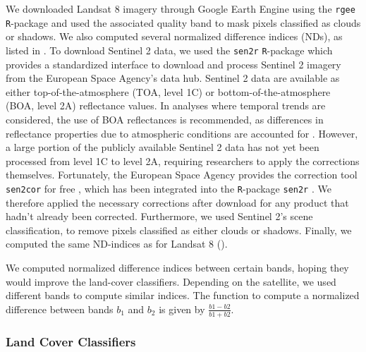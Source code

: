 \documentclass[../FinalThesis.tex]{subfiles}
\begin{document}
We downloaded Landsat 8 imagery through Google Earth Engine using the
\texttt{rgee} \texttt{R}-package \citep{Aybar.2024} and used the associated
quality band to mask pixels classified as clouds or shadows. We also computed
several normalized difference indices (NDs), as listed in . To download
Sentinel 2 data, we used the \texttt{sen2r} \texttt{R}-package
\citep{Ranghetti.2020} which provides a standardized interface to download and
process Sentinel 2 imagery from the European Space Agency's data hub. Sentinel 2
data are available as either top-of-the-atmosphere (TOA, level 1C) or
bottom-of-the-atmosphere (BOA, level 2A) reflectance values. In analyses where
temporal trends are considered, the use of BOA reflectances is recommended, as
differences in reflectance properties due to atmospheric conditions are
accounted for \citep{Gilabert.1994, Vermote.2008, Chraibi.2022}. However, a
large portion of the publicly available Sentinel 2 data has not yet been
processed from level 1C to level 2A, requiring researchers to apply the
corrections themselves. Fortunately, the European Space Agency provides the
correction tool \texttt{sen2cor} for free \citep{Main-Knorn.2017}, which has
been integrated into the \texttt{R}-package \texttt{sen2r}
\citep{Ranghetti.2020}. We therefore applied the necessary corrections after
download for any product that hadn't already been corrected. Furthermore, we
used Sentinel 2's scene classification, to remove pixels classified as either
clouds or shadows. Finally, we computed the same ND-indices as for Landsat 8
().

\begin{table}[h]
  \begin{center}
  \caption{We computed normalized difference indices between certain bands,
  hoping they would improve the land-cover classifiers. Depending on the
  satellite, we used different bands to compute similar indices. The function to
  compute a normalized difference between bands $b_1$ and $b_2$ is given by
  $\frac{b1 - b2}{b1 + b2}$.}
  \label{ND}
  \begin{threeparttable}[h]
    
  \end{threeparttable}
  \end{center}
\end{table}

\subsubsection{Land Cover Classifiers}
\end{document}
